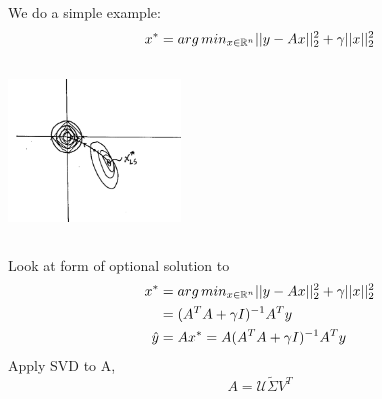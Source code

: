 We do a simple example:
\begin{equation*}
x^* = arg\,min_{x\in \mathbb{R}^n}||y-Ax||_2^2 + \gamma||x||_2^2
\end{equation*}

\begin{marginfigure}
	\centering
	\includegraphics[width=1.8in,height=1.8in]{figures/ch06/figure4.png}
\end{marginfigure}

Look at form of optional solution to 
\begin{align*}
x^* &= arg\,min_{x\in \mathbb{R}^n}||y-Ax||_2^2 + \gamma||x||^2_2\\
&= (A^TA + \gamma I)^{-1}A^Ty\\
\hat{y}&= Ax^* = A(A^TA + \gamma I)^{-1}A^Ty\\
\end{align*}
Apply SVD to A,
$$A = \mathcal{U}\tilde{\Sigma}V^T$$

